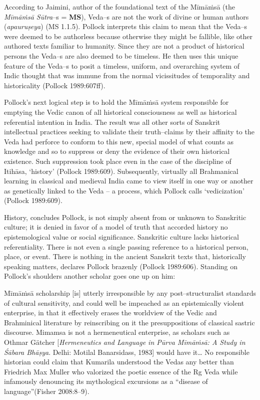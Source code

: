 According to Jaimini, author of the foundational text of the Mīmāṁsā (the \textit{Mīmāṁsā Sūtra}–s = \textbf{MS}), Veda–s are not the work of divine or human authors (\textit{apauruṣeya}) (MS 1.1.5). Pollock interprets this claim to mean that the Veda–s were deemed to be authorless because otherwise they might be fallible, like other authored texts familiar to humanity. Since they are not a product of historical persons the Veda–s are also deemed to be timeless. He then uses this unique feature of the Veda–s to posit a timeless, uniform, and overarching system of Indic thought that was immune from the normal vicissitudes of temporality and historicality (Pollock 1989:607ff). 

Pollock’s next logical step is to hold the Mīmāṁsā system responsible for emptying the Vedic canon of all historical consciousness as well as historical referential intention in India. The result was all other sorts of Sanskrit intellectual practices seeking to validate their truth–claims by their affinity to the Veda had perforce to conform to this new, special model of what counts as knowledge and so to suppress or deny the evidence of their own historical existence. Such suppression took place even in the case of the discipline of Itihāsa, ‘history’ (Pollock 1989:609). Subsequently, virtually all Brahmanical learning in classical and medieval India came to view itself in one way or another as genetically linked to the Veda – a process, which Pollock calls ‘vedicization’ (Pollock 1989:609).

History, concludes Pollock, is not simply absent from or unknown to Sanskritic culture; it is denied in favor of a model of truth that accorded history no epistemological value or social significance. Sanskritic culture lacks historical referentiality. There is not even a single passing reference to a historical person, place, or event. There is nothing in the ancient Sanskrit texts that, historically speaking matters, declares Pollock brazenly (Pollock 1989:606). Standing on Pollock’s shoulders another scholar goes one up on him:

\begin{myquote}
Mīmāṁsā scholarship [is] utterly irresponsible by any post–structuralist standards of cultural sensitivity, and could well be impeached as an epistemically violent enterprise, in that it effectively erases the worldview of the Vedic and Brahminical literature by reinscribing on it the presuppositions of classical sastric discourse. Mimamsa is not a hermeneutical enterprise, as scholars such as Othmar Gätcher [\textit{Hermeneutics and Language in Pūrva Mīmāṁsā: A Study in Śābara Bhāṣya}. Delhi: Motilal Banarsidass, 1983] would have it… No responsible historian could claim that Kumarila understood the Vedas any better than Friedrich Max Muller who valorized the poetic essence of the Rg Veda while infamously denouncing its mythological excursions as a “disease of language”\hfill (Fisher 2008:8–9).
\end{myquote}


